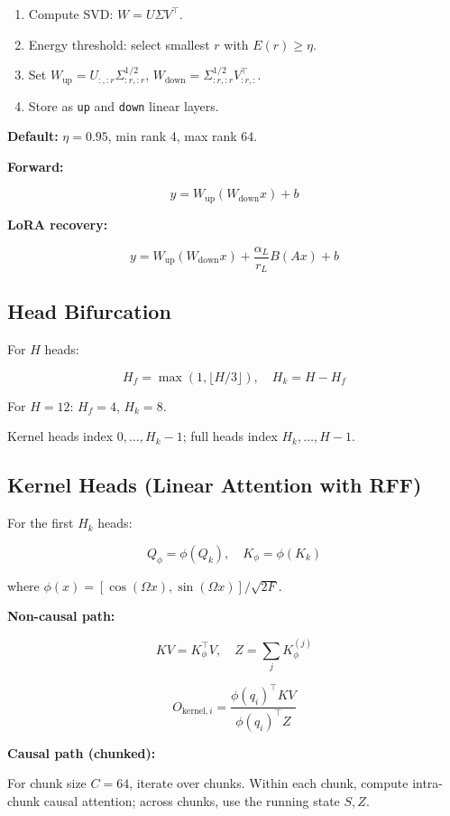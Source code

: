 \begin{enumerate}
\item Compute SVD: $W = U \Sigma V^\top$.
\item Energy threshold: select smallest $r$ with $E(r) \geq \eta$.
\item Set $W_\text{up} = U_{:, :r} \Sigma_{:r, :r}^{1/2}$, $W_\text{down} = \Sigma_{:r, :r}^{1/2} V_{:r, :}^\top$.
\item Store as \texttt{up} and \texttt{down} linear layers.

\end{enumerate}
\textbf{Default:} $\eta = 0.95$, min rank 4, max rank 64.

\textbf{Forward:}

\[
y = W_\text{up}(W_\text{down} x) + b
\tag{4.1}
\]

\textbf{LoRA recovery:}

\[
y = W_\text{up}(W_\text{down} x) + \frac{\alpha_L}{r_L} B(A x) + b
\tag{4.2}
\]

\subsection{Head Bifurcation}

For $H$ heads:

\[
H_f = \max(1, \lfloor H / 3 \rfloor), \quad H_k = H - H_f
\tag{4.3}
\]

For $H = 12$: $H_f = 4$, $H_k = 8$.

Kernel heads index $0, \ldots, H_k - 1$; full heads index $H_k, \ldots, H - 1$.

\subsection{Kernel Heads (Linear Attention with RFF)}

For the first $H_k$ heads:

\[
Q_\phi = \phi(Q_k), \quad K_\phi = \phi(K_k)
\tag{4.4}
\]

where $\phi(x) = [\cos(\Omega x), \sin(\Omega x)] / \sqrt{2F}$.

\textbf{Non-causal path:}

\[
KV = K_\phi^\top V, \quad Z = \sum_j K_\phi^{(j)}
\tag{4.5}
\]

\[
O_{\text{kernel}, i} = \frac{\phi(q_i)^\top KV}{\phi(q_i)^\top Z}
\tag{4.6}
\]

\textbf{Causal path (chunked):}

For chunk size $C = 64$, iterate over chunks. Within each chunk, compute 
intra-chunk causal attention; across chunks, use the running state $S, Z$.

